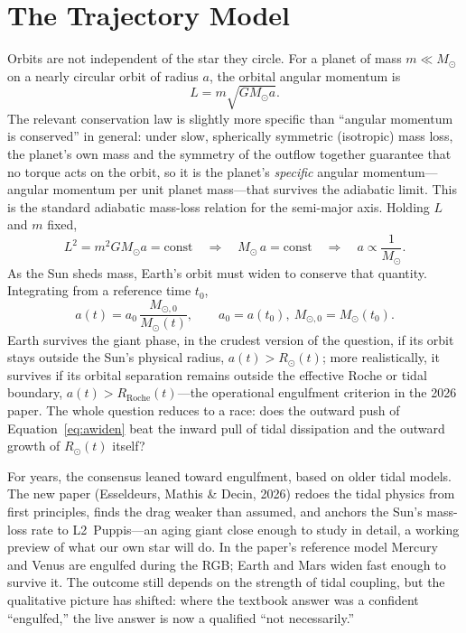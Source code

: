 \documentclass[11pt]{book}
\theoremstyle{plain}
\theoremstyle{definition}
\theoremstyle{remark}
\begin{document}
\section{The Trajectory Model}

Orbits are not independent of the star they circle. For a planet of mass $m \ll M_\odot$ on a nearly circular orbit of radius $a$, the orbital angular momentum is
\[
L = m\sqrt{GM_\odot a}.
\]
The relevant conservation law is slightly more specific than ``angular momentum is conserved'' in general: under slow, spherically symmetric (isotropic) mass loss, the planet's own mass and the symmetry of the outflow together guarantee that no torque acts on the orbit, so it is the planet's \emph{specific} angular momentum---angular momentum per unit planet mass---that survives the adiabatic limit. This is the standard adiabatic mass-loss relation for the semi-major axis. Holding $L$ and $m$ fixed,
\[
L^2 = m^2 G M_\odot a = \text{const} \quad\Longrightarrow\quad M_\odot\, a = \text{const} \quad\Longrightarrow\quad a \propto \frac{1}{M_\odot}.
\]
As the Sun sheds mass, Earth's orbit must widen to conserve that quantity. Integrating from a reference time $t_0$,
\begin{equation}
a(t) = a_0\,\frac{M_{\odot,0}}{M_\odot(t)}, \qquad a_0 = a(t_0),\ M_{\odot,0} = M_\odot(t_0).
\label{eq:awiden}
\end{equation}
Earth survives the giant phase, in the crudest version of the question, if its orbit stays outside the Sun's physical radius, $a(t) > R_\odot(t)$; more realistically, it survives if its orbital separation remains outside the effective Roche or tidal boundary, $a(t) > R_{\mathrm{Roche}}(t)$---the operational engulfment criterion in the 2026 paper. The whole question reduces to a race: does the outward push of Equation~\eqref{eq:awiden} beat the inward pull of tidal dissipation and the outward growth of $R_\odot(t)$ itself?

For years, the consensus leaned toward engulfment, based on older tidal models. The new paper (Esseldeurs, Mathis \& Decin, 2026) redoes the tidal physics from first principles, finds the drag weaker than assumed, and anchors the Sun's mass-loss rate to L2~Puppis---an aging giant close enough to study in detail, a working preview of what our own star will do. In the paper's reference model Mercury and Venus are engulfed during the RGB; Earth and Mars widen fast enough to survive it. The outcome still depends on the strength of tidal coupling, but the qualitative picture has shifted: where the textbook answer was a confident ``engulfed,'' the live answer is now a qualified ``not necessarily.''
\end{document}
